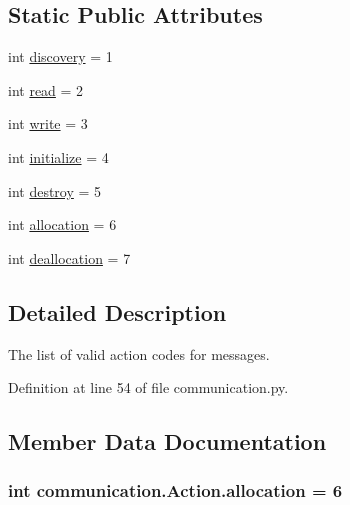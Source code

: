 \subsection*{Static Public Attributes}
\begin{DoxyCompactItemize}
\item 
int \hyperlink{classcommunication_1_1Action_a7a4e4011b8c89920d11f5979c92d5a93}{discovery} = 1
\item 
int \hyperlink{classcommunication_1_1Action_aad179f16299ae6a705d69f2796e5719b}{read} = 2
\item 
int \hyperlink{classcommunication_1_1Action_a026d0f117b06558a3a5a91aeffdd1755}{write} = 3
\item 
int \hyperlink{classcommunication_1_1Action_a605707caa83cf70de9a83822a7d9b557}{initialize} = 4
\item 
int \hyperlink{classcommunication_1_1Action_aecb68dde9b24828c7e924215be3401bf}{destroy} = 5
\item 
int \hyperlink{classcommunication_1_1Action_ac20af4a55f15d22845e8e3c2491c884b}{allocation} = 6
\item 
int \hyperlink{classcommunication_1_1Action_a396af30909af4f537ad93a1970ced10d}{deallocation} = 7
\end{DoxyCompactItemize}


\subsection{Detailed Description}
\begin{DoxyVerb}The list of valid action codes for messages.
\end{DoxyVerb}
 

Definition at line 54 of file communication.\+py.



\subsection{Member Data Documentation}
\hypertarget{classcommunication_1_1Action_ac20af4a55f15d22845e8e3c2491c884b}{}
\subsubsection[{allocation}]{\setlength{\rightskip}{0pt plus 5cm}int communication.\+Action.\+allocation = 6\hspace{0.3cm}{\ttfamily [static]}}\label{classcommunication_1_1Action_ac20af4a55f15d22845e8e3c2491c884b}


